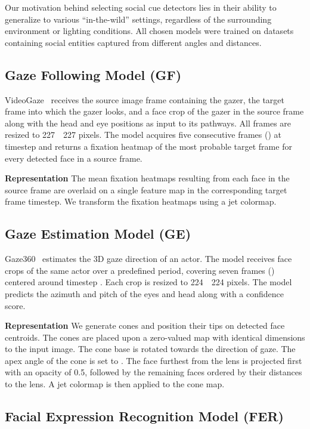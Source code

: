\documentclass{article}
\begin{document}
Our motivation behind selecting social cue detectors lies in their ability to generalize to various ``in-the-wild'' settings, regardless of the surrounding environment or lighting conditions. All chosen models were trained on datasets containing social entities captured from different angles and distances. 

\subsection{Gaze Following Model (GF)}

VideoGaze~\cite{recasens2017following} receives the source image frame containing the gazer, the target frame into which the gazer looks, and a face crop of the gazer in the source frame along with the head and eye positions as input to its pathways. 
All frames are resized to 227~~227 pixels. 
The model acquires five consecutive frames () at timestep  and returns a fixation heatmap of the most probable target frame for every detected face in a source frame. 

\textbf{Representation} The mean fixation heatmaps resulting from each face in the source frame are overlaid on a single feature map in the corresponding target frame timestep. We transform the fixation heatmaps using a jet colormap.

\subsection{Gaze Estimation Model (GE)}

Gaze360~\cite{kellnhofer2019gaze360} estimates the 3D gaze direction of an actor. The model receives face crops of the same actor over a predefined period, covering seven frames () centered around timestep . Each crop is resized to 224~~224 pixels. The model predicts the azimuth and pitch of the eyes and head along with a confidence score.

\textbf{Representation} 
We generate cones and position their tips on detected face centroids.
The cones are placed upon a zero-valued map with identical dimensions to the input image. The cone base is rotated towards the direction of gaze. 
The apex angle of the cone is set to . The face furthest 
from the lens is projected first with an opacity of 0.5, followed by the remaining faces ordered by their distances to the lens. A jet colormap is then applied to the cone map.

\subsection{Facial Expression Recognition Model (FER)}
\end{document}
